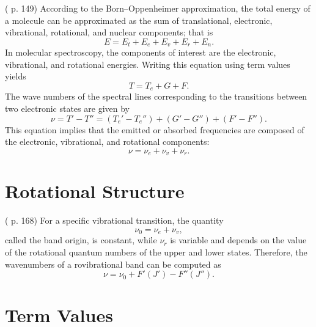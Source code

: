 \documentclass[11pt, twoside, fleqn]{report}
\begin{document}
(\cite{herzbergMolecularSpectraMolecular1950} p. 149)
According to the Born--Oppenheimer approximation, the total energy of a molecule can be approximated as the sum of translational, electronic, vibrational, rotational, and nuclear components; that is
\begin{equation*}
    E = E_t + E_e + E_v + E_r + E_n.
\end{equation*}
In molecular spectroscopy, the components of interest are the electronic, vibrational, and rotational energies. Writing this equation using term values yields
\begin{equation*}
    T = T_e + G + F.
\end{equation*}
The wave numbers of the spectral lines corresponding to the transitions between two electronic states are given by
\begin{equation*}
    \nu = T' - T'' = (T_e' - T_e'') + (G' - G'') + (F' - F'').
\end{equation*}
This equation implies that the emitted or absorbed frequencies are composed of the electronic, vibrational, and rotational components:
\begin{equation*}
    \nu = \nu_e + \nu_v + \nu_r.
\end{equation*}

\section{Rotational Structure}

(\cite{herzbergMolecularSpectraMolecular1950} p. 168)
For a specific vibrational transition, the quantity
\begin{equation*}
    \nu_0 = \nu_e + \nu_v,
\end{equation*}
called the band origin, is constant, while $\nu_r$ is variable and depends on the value of the rotational quantum numbers of the upper and lower states. Therefore, the wavenumbers of a rovibrational band can be computed as
\begin{equation*}
    \nu = \nu_0 + F'(J') - F''(J'').
\end{equation*}

\section{Term Values}
\end{document}
